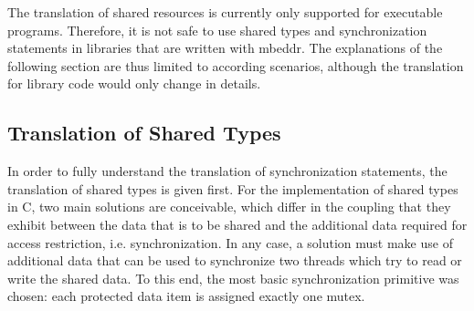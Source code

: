 The translation of shared resources is currently only supported for executable programs. Therefore, it is not safe to use shared types and synchronization statements in libraries that are written with mbeddr. The explanations of the following section are thus limited to according scenarios, although the translation for library code would only change in details.

\subsection{Translation of Shared Types}
\label{sharedTypesTranslation}
In order to fully understand the translation of synchronization statements, the translation of shared types is given first. For the implementation of shared types in C, two main solutions are conceivable, which differ in the coupling that they exhibit between the data that is to be shared and the additional data required for access restriction, i.e. synchronization. In any case, a solution must make use of additional data that can be used to synchronize two threads which try to read or write the shared data. To this end, the most basic synchronization primitive was chosen: each protected data item is assigned exactly one mutex. 

